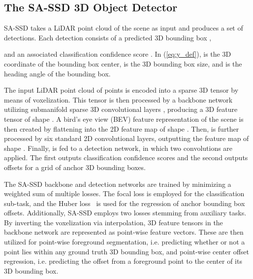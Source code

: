 \documentclass[letterpaper, 10 pt, conference]{ieeeconf}
\begin{document}
\subsection{The SA-SSD 3D Object Detector}
\label{section:method_sassd}
SA-SSD \cite{he2020structure} takes a LiDAR point cloud of the scene as input  and produces a set  of  detections. Each detection  consists of a predicted 3D bounding box , 

and an associated classification confidence score . In (\ref{eq:y_def}),  is the 3D coordinate of the bounding box center,  is the 3D bounding box size, and  is the heading angle of the bounding box.  

The input LiDAR point cloud  of  points is encoded into a sparse 3D tensor by means of voxelization. This tensor is then processed by a backbone network utilizing submanifold sparse 3D convolutional layers \cite{yan2018second, graham20183d}, producing a 3D feature tensor  of shape . A bird's eye view (BEV) feature representation of the scene is then created by flattening  into the 2D feature map  of shape . Then,  is further processed by six standard 2D convolutional layers, outputting the feature map  of shape . Finally,  is fed to a detection network, in which two  convolutions are applied. The first outputs classification confidence scores and the second outputs offsets for a  grid of anchor 3D bounding boxes.

The SA-SSD backbone and detection networks are trained by minimizing a weighted sum of multiple losses. The focal loss \cite{lin2017focal} is employed for the classification sub-task, and the Huber loss~\cite{huber1964robust} is used for the regression of anchor bounding box offsets. Additionally, SA-SSD employs two losses stemming from auxiliary tasks. By inverting the voxelization via interpolation, 3D feature tensors in the backbone network are represented as point-wise feature vectors. These are then utilized for point-wise foreground segmentation, i.e. predicting whether or not a point lies within any ground truth 3D bounding box, and point-wise center offset regression, i.e. predicting the offset from a foreground point to the center of its 3D bounding box. 
\end{document}
